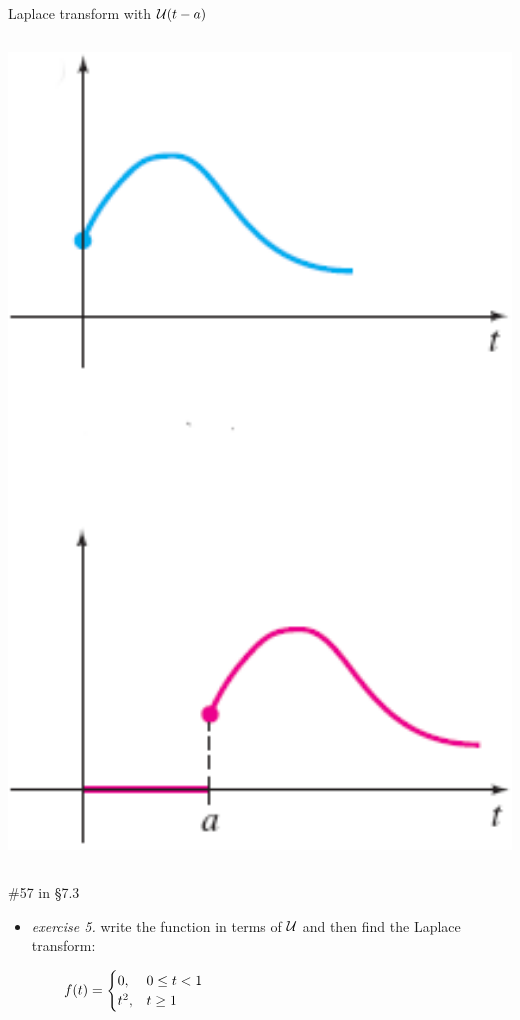 \documentclass[dvipsnames,colorlinks]{beamer}
\begin{document}
\begin{frame}{Laplace transform with $\mathcal{U}(t-a)$}
\begin{columns}
\begin{column}{0.2\textwidth}
\vspace{5mm}
\hspace{-5mm} \includegraphics[width=1.2\textwidth]{figs/fanditstrans}
\end{column}
\end{columns}
\end{frame}


\begin{frame}{\#57 in \S7.3}

\begin{itemize}
\item \emph{exercise 5.}  write the function in terms of $\mathcal{U}$ and then find the Laplace transform:

\vspace{-3mm}
    $$f(t) = \begin{cases} 0, & 0 \le t < 1 \\ t^2, & t\ge 1 \end{cases} \hspace{70mm}$$

\vspace{55mm}
\end{itemize}
\end{frame}
\end{document}

